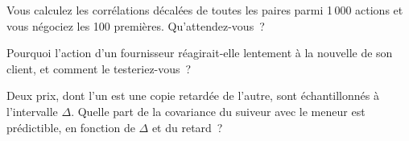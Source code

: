 \begin{interviewq}\label{iq:rs:cross-sectional-and-cross-asset-features:4}
Vous calculez les corrélations décalées de toutes les paires parmi 1\,000 actions et vous négociez les 100 premières. Qu'attendez-vous~?
\end{interviewq}

\begin{interviewq}\label{iq:rs:cross-sectional-and-cross-asset-features:5}
Pourquoi l'action d'un fournisseur réagirait-elle lentement à la nouvelle de son client, et comment le testeriez-vous~?
\end{interviewq}

\begin{interviewq}\label{iq:rs:cross-sectional-and-cross-asset-features:6}
Deux prix, dont l'un est une copie retardée de l'autre, sont échantillonnés à l'intervalle $\Delta$. Quelle part de la covariance du suiveur avec le meneur
est prédictible, en fonction de $\Delta$ et du retard~?
\end{interviewq}
